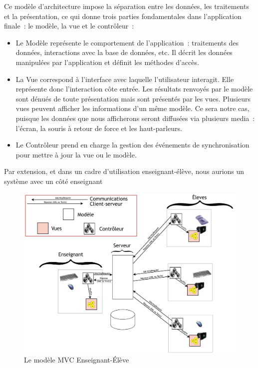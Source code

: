 \documentclass[
]{book}
\providecommand{\tightlist}{%
  \setlength{\itemsep}{0pt}\setlength{\parskip}{0pt}}
\begin{document}
Ce modèle d'architecture impose la séparation entre les données, les
traitements et la présentation, ce qui donne trois parties fondamentales dans
l'application finale~: le modèle, la vue et le contrôleur~:

\begin{itemize}
\tightlist
\item
  Le Modèle représente le comportement de
  l'application~: traitements des données, interactions avec la base de
  données, etc. Il décrit les données manipulées par l'application et définit
  les méthodes d'accès.
\item
  La Vue correspond à l'interface avec laquelle
  l'utilisateur interagit. Elle représente donc l'interaction côte entrée.
  Les résultats renvoyés par le modèle sont dénués de toute présentation mais
  sont présentés par les vues. Plusieurs vues peuvent afficher les
  informations d'un même modèle. Ce sera notre cas, puisque les données que
  nous afficherons seront diffusées via plusieurs media~: l'écran, la souris
  à retour de force et les haut-parleurs.
\item
  Le Contrôleur prend en charge la gestion des
  événements de synchronisation pour mettre à jour la vue ou le modèle.
\end{itemize}

Par extension, et dans un cadre d'utilisation enseignant-élève, nous
aurions un système avec un côté enseignant

\begin{figure}
\centering
\includegraphics{img/mvc.png}
\caption{\label{fig:mvc}Le modèle MVC Enseignant-Élève}
\end{figure}
\end{document}
